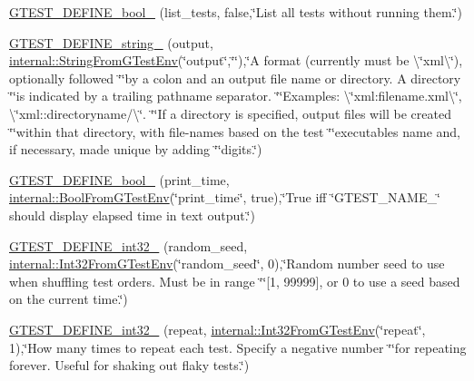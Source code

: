 \begin{DoxyCompactItemize}
\item 
\hyperlink{namespacetesting_a9ef54a5b29ac4b2a1e086e77224a0b19}{G\+T\+E\+S\+T\+\_\+\+D\+E\+F\+I\+N\+E\+\_\+bool\+\_\+} (list\+\_\+tests, false,\char`\"{}List all tests without running them.\char`\"{})
\item 
\hyperlink{namespacetesting_a9f8de43b364103bafa1e8ca4bebe9d58}{G\+T\+E\+S\+T\+\_\+\+D\+E\+F\+I\+N\+E\+\_\+string\+\_\+} (output, \hyperlink{namespacetesting_1_1internal_a7ed785df46a339403b0f749d3a879201}{internal\+::\+String\+From\+G\+Test\+Env}(\char`\"{}output\char`\"{},\char`\"{}\char`\"{}),\char`\"{}A format (currently must be \textbackslash{}\char`\"{}xml\textbackslash{}\char`\"{}), optionally followed \char`\"{}\char`\"{}by a colon and an output file name or directory. A directory \char`\"{}\char`\"{}is indicated by a trailing pathname separator. \char`\"{}\char`\"{}Examples\+: \textbackslash{}\char`\"{}xml\+:filename.\+xml\textbackslash{}\char`\"{}, \textbackslash{}\char`\"{}xml\+::directoryname/\textbackslash{}\char`\"{}. \char`\"{}\char`\"{}If a directory is specified, output files will be created \char`\"{}\char`\"{}within that directory, with file-\/names based on the test \char`\"{}\char`\"{}executable\textquotesingle{}s name and, if necessary, made unique by adding \char`\"{}\char`\"{}digits.\char`\"{})
\item 
\hyperlink{namespacetesting_a51fb68302e8e3fce5bd61340843a6e6a}{G\+T\+E\+S\+T\+\_\+\+D\+E\+F\+I\+N\+E\+\_\+bool\+\_\+} (print\+\_\+time, \hyperlink{namespacetesting_1_1internal_a67132cdce23fb71b6c38ee34ef81eb4c}{internal\+::\+Bool\+From\+G\+Test\+Env}(\char`\"{}print\+\_\+time\char`\"{}, true),\char`\"{}True iff \char`\"{}G\+T\+E\+S\+T\+\_\+\+N\+A\+M\+E\+\_\+\char`\"{} should display elapsed time in text output.\char`\"{})
\item 
\hyperlink{namespacetesting_a25e098abb7ce93d06582d48434be90c7}{G\+T\+E\+S\+T\+\_\+\+D\+E\+F\+I\+N\+E\+\_\+int32\+\_\+} (random\+\_\+seed, \hyperlink{namespacetesting_1_1internal_a0f7e728793f9e6cb0aa2b69eaa468bf3}{internal\+::\+Int32\+From\+G\+Test\+Env}(\char`\"{}random\+\_\+seed\char`\"{}, 0),\char`\"{}Random number seed to use when shuffling test orders.  Must be in range \char`\"{}\char`\"{}\mbox{[}1, 99999\mbox{]}, or 0 to use a seed based on the current time.\char`\"{})
\item 
\hyperlink{namespacetesting_a8b2c1dad0764e0984486bae49a988f0e}{G\+T\+E\+S\+T\+\_\+\+D\+E\+F\+I\+N\+E\+\_\+int32\+\_\+} (repeat, \hyperlink{namespacetesting_1_1internal_a0f7e728793f9e6cb0aa2b69eaa468bf3}{internal\+::\+Int32\+From\+G\+Test\+Env}(\char`\"{}repeat\char`\"{}, 1),\char`\"{}How many times to repeat each test.  Specify a negative number \char`\"{}\char`\"{}for repeating forever.  Useful for shaking out flaky tests.\char`\"{})

\end{DoxyCompactItemize}

